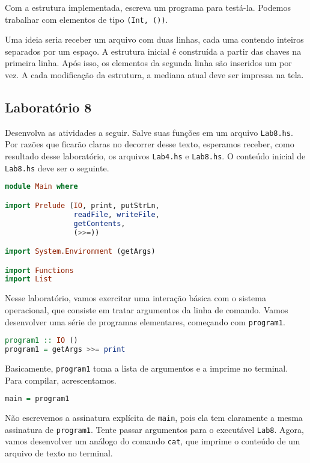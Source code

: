 \documentclass[a4paper]{article}
\begin{document}
Com a estrutura implementada, escreva um programa para testá-la.
Podemos trabalhar com elementos de tipo \texttt{(Int, ())}.

Uma ideia seria receber um arquivo com duas linhas, cada uma contendo inteiros separados por um espaço.
A estrutura inicial é construída a partir das chaves na primeira linha.
Após isso, os elementos da segunda linha são inseridos um por vez.
A cada modificação da estrutura, a mediana atual deve ser impressa na tela.

\subsection{Laboratório 8}

Desenvolva as atividades a seguir.
Salve suas funções em um arquivo \texttt{Lab8.hs}.
Por razões que ficarão claras no decorrer desse texto, esperamos receber, como resultado desse laboratório, os arquivos \texttt{Lab4.hs} e \texttt{Lab8.hs}.
O conteúdo inicial de \texttt{Lab8.hs} deve ser o seguinte.

\pagebreak

\begin{lstlisting}[language=haskell, frame=single]
module Main where

import Prelude (IO, print, putStrLn,
                readFile, writeFile,
                getContents,
                (>>=))

import System.Environment (getArgs)

import Functions
import List
\end{lstlisting}

Nesse laboratório, vamos exercitar uma interação básica com o sistema operacional, que consiste em tratar argumentos da linha de comando.
Vamos desenvolver uma série de programas elementares, começando com \texttt{program1}.

\begin{lstlisting}[language=haskell, frame=single]
program1 :: IO ()
program1 = getArgs >>= print
\end{lstlisting}

Basicamente, \texttt{program1} toma a lista de argumentos e a imprime no terminal.
Para compilar, acrescentamos.

\begin{lstlisting}[language=haskell, frame=single]
main = program1
\end{lstlisting}

Não escrevemos a assinatura explícita de \texttt{main}, pois ela tem claramente a mesma assinatura de \texttt{program1}.
Tente passar argumentos para o executável \texttt{Lab8}.
Agora, vamos desenvolver um análogo do comando \texttt{cat}, que imprime o conteúdo de um arquivo de texto no terminal.
\end{document}
